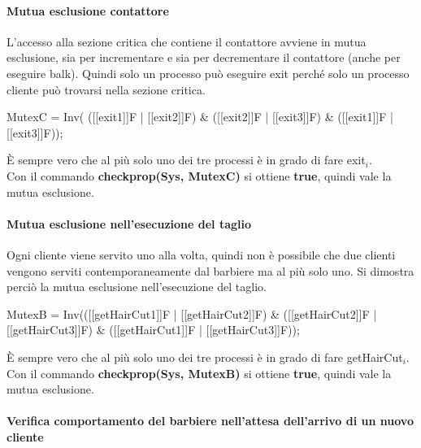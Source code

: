 \paragraph{Mutua esclusione contattore}\mbox{}

L'accesso alla sezione critica che contiene il contattore avviene in mutua esclusione, sia per incrementare e sia per decrementare il contattore (anche per eseguire \textsf{balk}). Quindi solo un processo può eseguire \textsf{exit} perché solo un processo cliente può trovarsi nella sezione critica.

\begin{center}
	\textsf{MutexC = Inv(
	([[exit1]]F | [[exit2]]F) \& 
 ([[exit2]]F | [[exit3]]F) \&
([[exit1]]F | [[exit3]]F));}
\end{center}

È sempre vero che al più solo uno dei tre processi è in grado di fare \textsf{exit$_{i}$}.\\
Con il commando \textbf{checkprop(Sys, MutexC)} si ottiene \textbf{true}, quindi vale la mutua esclusione.

\paragraph{Mutua esclusione nell'esecuzione del taglio}\mbox{}

Ogni cliente viene servito uno alla volta, quindi non è possibile che due clienti vengono serviti contemporaneamente dal barbiere ma al più solo uno. Si dimostra perciò la mutua esclusione nell'esecuzione del taglio.

\begin{center}
	\textsf{MutexB = Inv(([[getHairCut1]]F | [[getHairCut2]]F) \& ([[getHairCut2]]F | [[getHairCut3]]F) \& ([[getHairCut1]]F | [[getHairCut3]]F));}
\end{center}

È sempre vero che al più solo uno dei tre processi è in grado di fare \textsf{getHairCut$_{i}$}.\\
Con il commando \textbf{checkprop(Sys, MutexB)} si ottiene \textbf{true}, quindi vale la mutua esclusione.


\paragraph{Verifica comportamento del barbiere nell'attesa dell'arrivo di un nuovo cliente }\mbox{}

